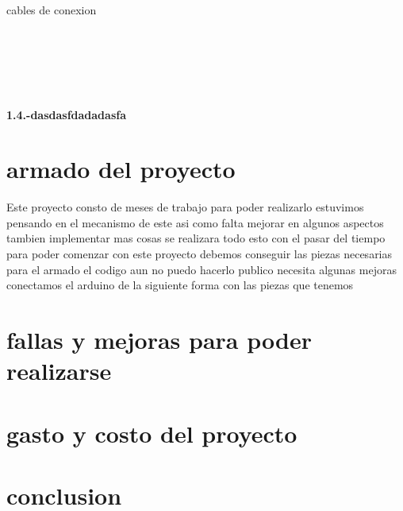 \documentclass[11pt, letterpaper]{article}
\begin{document}
cables de conexion
\\ \\ 
\\ \\ 
\\ \\ 
\begin{center}
    \textbf{1.4.-dasdasfdadadasfa}
\end{center}






\section{armado del proyecto }
Este proyecto consto de meses de trabajo para poder realizarlo
estuvimos pensando en el mecanismo de este asi como falta 
mejorar en algunos aspectos tambien implementar mas cosas 
se realizara todo esto con el pasar del tiempo para poder comenzar 
con este proyecto debemos conseguir las piezas necesarias para el armado 
el codigo aun no puedo hacerlo publico necesita algunas mejoras conectamos el arduino
de la siguiente forma con las piezas que tenemos 
\section{fallas y mejoras para poder realizarse}
\section{gasto y costo del proyecto}
\section{conclusion}
\end{document}
